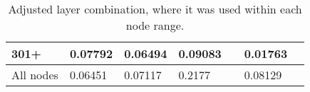 \begin{table*}[h!]
\begin{tabular}{|l|l|l||l|l||l|l|}
        301+      & 0.07792                                 & 0.06494                        & 0.09083                          &                  & 0.01763       &                  \\ \hline
        All nodes & 0.06451                                 & 0.07117                        & 0.2177                           &                  & 0.08129       &                  \\ \hline
    \end{tabular}
    \caption{Adjusted layer combination, where it was used within each node range.}
    \label{tab:recall-adjusted-layer-bad-performance}
\end{table*}

